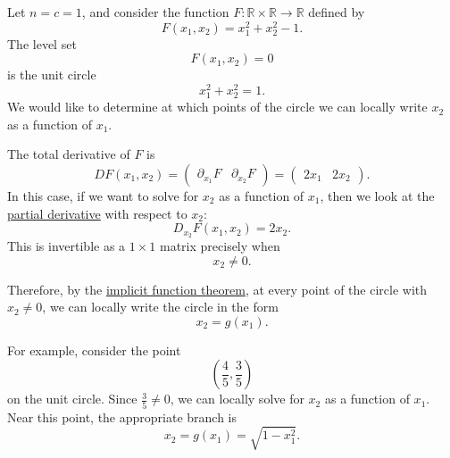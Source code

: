 	\begin{example}
	  \label{ex:circle-example}
		Let $n=c=1$, and consider the function
		$F:\mathbb{R} \times \mathbb{R} \to \mathbb{R}$ defined by
		\begin{equation}
			F(x_1,x_2) = x_1^2 + x_2^2 - 1.
		\end{equation}
		The level set
		\begin{equation}
			F(x_1,x_2)=0
		\end{equation}
		is the unit circle
		\begin{equation}
			x_1^2+x_2^2=1.
		\end{equation}
		We would like to determine at which points of the circle we can locally
		write $x_2$ as a function of $x_1$.

		The total derivative of $F$ is
		\begin{equation}
			DF(x_1,x_2)
			=
			\begin{pmatrix}
				\partial_{x_1}F & \partial_{x_2}F
			\end{pmatrix}
			=
			\begin{pmatrix}
				2x_1 & 2x_2
			\end{pmatrix}.
		\end{equation}
		In this case, if we want to solve for $x_2$ as a function of $x_1$, then
		we look at the \hyperref[def:partial-derivative]{partial derivative} with respect to $x_2$:
		\begin{equation}
			D_{x_2}F(x_1,x_2) = 2x_2.
		\end{equation}
		This is invertible as a $1 \times 1$ matrix precisely when
		\begin{equation}
			x_2 \neq 0.
		\end{equation}

		Therefore, by the \hyperref[thm:implicit-function-theorem]{implicit function theorem}, at every point of the circle
		with $x_2 \neq 0$, we can locally write the circle in the form
		\begin{equation}
			x_2 = g(x_1).
		\end{equation}

		For example, consider the point
		\begin{equation}
			\left(\frac{4}{5},\frac{3}{5}\right)
		\end{equation}
		on the unit circle. Since $\frac{3}{5}\neq 0$, we can locally solve for
		$x_2$ as a function of $x_1$. Near this point, the appropriate branch is
		\begin{equation}
			x_2 = g(x_1) = \sqrt{1-x_1^2}.
		\end{equation}


\end{example}
